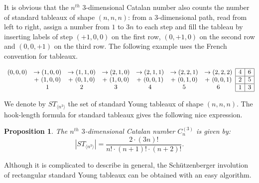 \documentclass{amsart}
\newtheorem{proposition}[theorem]{Proposition}
\begin{document}
It is obvious that the $n^{th}$ $3$-dimensional Catalan
number also counts the number of standard tableaux of shape
$(n,n,n)$: from a $3$-dimensional path, read from left to right, 
assign a number from $1$ to $3n$ to each step and fill the tableau
by inserting labels of step $(+1,0,0)$ on the first row, $(0,+1,0)$ on the
second row and $(0,0,+1)$ on the third row. The following example
uses the French convention for tableaux.

\begin{small}
  \begin{equation}
    \begin{array}{ccccccc}
      (0,0,0) & \rightarrow (1,0,0) & \rightarrow (1,1,0) & \rightarrow
      (2,1,0) & \rightarrow (2,1,1) & \rightarrow (2,2,1) & \rightarrow
      (2,2,2) \\
              & +~(1,0,0) & +~(0,1,0) & +~(1,0,0) & +~(0,0,1) & +~(0,1,0) & +~(0,0,1) \\
              & 1 & 2 & 3 & 4 & 5 & 6 \\
    \end{array}
    \begin{array}{|c|c|} \hline
      4 & 6 \\ \hline
      2 & 5 \\ \hline
      1 & 3 \\ \hline
    \end{array}
\end{equation}
\end{small}

We denote by $ST_{\langle n^3 \rangle}$ the set of standard Young
tableaux of shape $(n,n,n)$.  The hook-length formula for standard
tableaux gives the following nice expression.

\begin{proposition}
  The $n^{th}$ $3$-dimensional Catalan number $C^{(3)}_n$ is given by:
  \begin{equation}
    |ST_{\langle n^3 \rangle}| = \frac{2\cdot(3n)!}{n! \cdot (n+1)! \cdot (n+2)!}.
  \end{equation}
\end{proposition}


Although it is complicated to describe in general, the Schützenberger
involution of rectangular standard Young tableaux can be obtained with an
easy algorithm.
\end{document}
